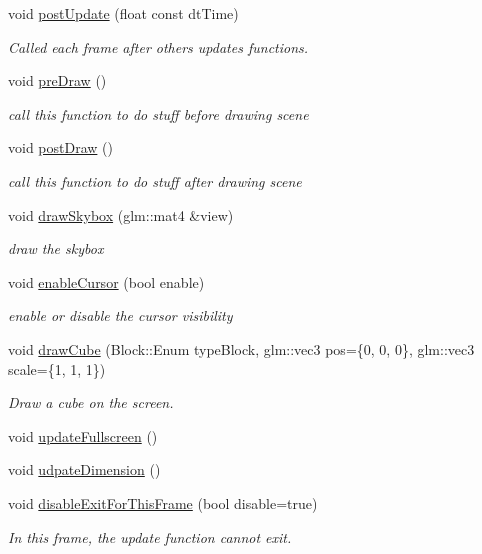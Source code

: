 \begin{DoxyCompactItemize}
void \hyperlink{class_gui_a0e365402acdc30d41e31a76124182ded}{post\+Update} (float const dt\+Time)
\begin{DoxyCompactList}\small\item\em Called each frame after others updates functions. \end{DoxyCompactList}\item 
\mbox{\label{class_gui_aac64766fad448534447f50a5d05ceeb3}} 
void \hyperlink{class_gui_aac64766fad448534447f50a5d05ceeb3}{pre\+Draw} ()
\begin{DoxyCompactList}\small\item\em call this function to do stuff before drawing scene \end{DoxyCompactList}\item 
\mbox{\label{class_gui_aef4dba11a3ab3836f51a09dbfc7c09d1}} 
void \hyperlink{class_gui_aef4dba11a3ab3836f51a09dbfc7c09d1}{post\+Draw} ()
\begin{DoxyCompactList}\small\item\em call this function to do stuff after drawing scene \end{DoxyCompactList}\item 
void \hyperlink{class_gui_a97349551e251e2dd231ec8c9abc9c659}{draw\+Skybox} (glm\+::mat4 \&view)
\begin{DoxyCompactList}\small\item\em draw the skybox \end{DoxyCompactList}\item 
void \hyperlink{class_gui_adf3543c8344b6e45aeebd2f2da2bf373}{enable\+Cursor} (bool enable)
\begin{DoxyCompactList}\small\item\em enable or disable the cursor visibility \end{DoxyCompactList}\item 
void \hyperlink{class_gui_a814f9d026e56dd0a8053cad3cdd03bec}{draw\+Cube} (Block\+::\+Enum type\+Block, glm\+::vec3 pos=\{0, 0, 0\}, glm\+::vec3 scale=\{1, 1, 1\})
\begin{DoxyCompactList}\small\item\em Draw a cube on the screen. \end{DoxyCompactList}\item 
void \hyperlink{class_gui_a42148f338094a05cfbe4ac4424ebc127}{update\+Fullscreen} ()
\item 
void \hyperlink{class_gui_a4066b5f349a7f94203bd0ac506a47571}{udpate\+Dimension} ()
\item 
void \hyperlink{class_gui_a454e08f8d8c19a95c5bb9554b7766723}{disable\+Exit\+For\+This\+Frame} (bool disable=true)
\begin{DoxyCompactList}\small\item\em In this frame, the update function cannot exit. \end{DoxyCompactList}\end{DoxyCompactItemize}
